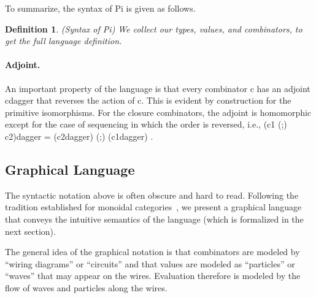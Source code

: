 \documentclass[preprint]{sigplanconf}
\newtheorem{definition}[theorem]{Definition}
\begin{document}
To summarize, the syntax of {{Pi}} is given as follows. 

\begin{definition}{(Syntax of {{Pi}})}
\label{def:Pi}
We collect our types, values, and combinators, to get the full language
definition.
%
\end{definition}

\paragraph*{Adjoint.} 
An important property of the language is that every combinator {{c}} has an
adjoint {{c{dagger}}} that reverses the action of {{c}}. This is evident by
construction for the primitive isomorphisms. For the closure combinators, the
adjoint is homomorphic except for the case of sequencing in which the order
is reversed, i.e., {{(c1 (;) c2){dagger} = (c2{dagger}) (;) (c1{dagger}) }}.

\subsection{Graphical Language}

The syntactic notation above is often obscure and hard to read.  Following
the tradition established for monoidal
categories~\cite{springerlink:10.1007/978-3-642-12821-94}, we present a
graphical language that conveys the intuitive semantics of the language
(which is formalized in the next section).

The general idea of the graphical notation is that combinators are modeled by
``wiring diagrams'' or ``circuits'' and that values are modeled as
``particles'' or ``waves'' that may appear on the wires. Evaluation therefore
is modeled by the flow of waves and particles along the wires.

\end{document}
